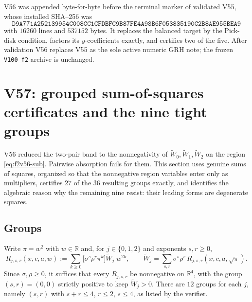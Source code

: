 \documentclass[11pt]{article}
\theoremstyle{definition}
\theoremstyle{remark}
\begin{document}
V56 was appended byte-for-byte before the terminal marker of validated
V55, whose installed SHA--256 was
\[
 \texttt{D9A771A252139954C008CC1CFDBFC9B8}
 \allowbreak\texttt{7FE4A98B6F053835190C2B8AE955BEA9}
\]
with \(16260\) lines and \(537152\) bytes.  It replaces the balanced
target by the Pick-disk condition, factors its \(y\)-coefficients
exactly, and certifies two of the five.  After validation V56 replaces
V55 as the sole active numeric GRH note; the frozen \texttt{V100\_f2}
archive is unchanged.





\clearpage
\section{V57: grouped sum-of-squares certificates and the nine tight groups}
\label{sec:f2v57-groups}
\begingroup
\setcounter{equation}{0}
\renewcommand{\theequation}{N57.\arabic{equation}}
\renewcommand{\theHequation}{f2v57.\arabic{equation}}

V56 reduced the two-pair band to the nonnegativity of
\(\widetilde W_0,\widetilde W_1,\widetilde W_2\) on the region
\eqref{eq:f2v56-sub}.  Pairwise absorption fails for them.  This section
uses genuine sums of squares, organized so that the nonnegative region
variables enter only as multipliers, certifies \(27\) of the \(36\)
resulting groups exactly, and identifies the algebraic reason why the
remaining nine resist: their leading forms are degenerate squares.

\subsection{Groups}

Write \(\pi=w^2\) with \(w\in\mathbb R\) and, for \(j\in\{0,1,2\}\) and
exponents \(s,r\ge0\),
\begin{equation}
 R_{j,s,r}(x,c,a,w):=\sum_{k\ge0}\bigl[\sigma^s\rho^r\pi^k\bigr]\widetilde W_j\;w^{2k},
 \qquad
 \widetilde W_j=\sum_{s,r}\sigma^s\rho^r\,R_{j,s,r}(x,c,a,\sqrt\pi).
 \label{eq:f2v57-groups}
\end{equation}
Since \(\sigma,\rho\ge0\), it suffices that every \(R_{j,s,r}\) be
nonnegative on \(\mathbb R^4\), with the group \((s,r)=(0,0)\) strictly
positive to keep \(\widetilde W_j>0\).  There are \(12\) groups for each
\(j\), namely \((s,r)\) with \(s+r\le4\), \(r\le2\), \(s\le4\), as listed
by the verifier.
\end{document}
